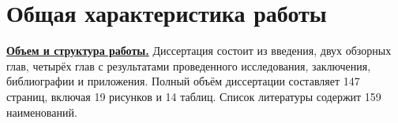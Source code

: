 \section*{Общая характеристика работы}

\newcommand{\actuality}{\pdfbookmark[1]{Актуальность}{actuality}\underline{\textbf{\actualityTXT}}}
\newcommand{\progress}{\pdfbookmark[1]{Разработанность темы}{progress}\underline{\textbf{\progressTXT}}}
\newcommand{\aim}{\pdfbookmark[1]{Цели}{aim}\underline{{\textbf\aimTXT}}}
\newcommand{\tasks}{\pdfbookmark[1]{Задачи}{tasks}\underline{\textbf{\tasksTXT}}}
\newcommand{\aimtasks}{\pdfbookmark[1]{Цели и задачи}{aimtasks}\aimtasksTXT}
\newcommand{\novelty}{\pdfbookmark[1]{Научная новизна}{novelty}\underline{\textbf{\noveltyTXT}}}
\newcommand{\thInfluence}{\pdfbookmark[1]{Теоретическая значимость}{thInfluence}\underline{\textbf{\thInfluenceTXT}}}
\newcommand{\prInfluence}{\pdfbookmark[1]{Практическая значимость}{prInfluence}\underline{\textbf{\prInfluenceTXT}}}
\newcommand{\methods}{\pdfbookmark[1]{Методология и методы исследования}{methods}\underline{\textbf{\methodsTXT}}}
\newcommand{\defpositions}{\pdfbookmark[1]{Положения, выносимые на защиту}{defpositions}\underline{\textbf{\defpositionsTXT}}}
\newcommand{\reliability}{\pdfbookmark[1]{Достоверность}{reliability}\underline{\textbf{\reliabilityTXT}}}
\newcommand{\probation}{\pdfbookmark[1]{Апробация}{probation}\underline{\textbf{\probationTXT}}}
\newcommand{\contribution}{\pdfbookmark[1]{Личный вклад}{contribution}\underline{\textbf{\contributionTXT}}}
\newcommand{\publications}{\pdfbookmark[1]{Публикации}{publications}\underline{\textbf{\publicationsTXT}}}



\underline{\textbf{Объем и структура работы.}} Диссертация состоит из введения, двух обзорных глав, четырёх глав с результатами проведенного исследования, заключения, библиографии и приложения. Полный объём диссертации составляет 147 страниц, включая 19 рисунков и 14 таблиц. Список литературы содержит 159 наименований.

